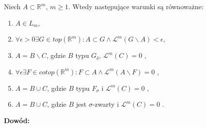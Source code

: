 \begin{tw}
	Niech $A \subset \mathbb{R}^m$, $m \geq 1$. Wtedy następujące warunki są równoważne:
	\begin{enumerate}
		\item $A \in L_m$,
		\item $\forall \epsilon > 0 \exists G \in top(\mathbb{R}^m): A \subset G \wedge \mathcal{L}^m(G \backslash A) < \epsilon$,
		\item $A = B \backslash C$, gdzie $B$ typu $G_{\delta}$, $\mathcal{L}^m(C) = 0$ ,
		\item $\forall \epsilon \exists F \in cotop(\mathbb{R}^m): F \subset A \wedge \mathcal{L}^m(A \backslash F) = 0$  ,
		\item $A = B \cup C$, gdzie $B$ typu $F_{\sigma}$ i  $\mathcal{L}^m(C) = 0$ ,
		\item $A = B \cup C$, gdzie $B$ jest $\sigma$-zwarty i $\mathcal{L}^m(C) = 0$ .
	\end{enumerate}

	\textbf{Dowód:} \citep[3.42]{Tworzewski}
\end{tw}